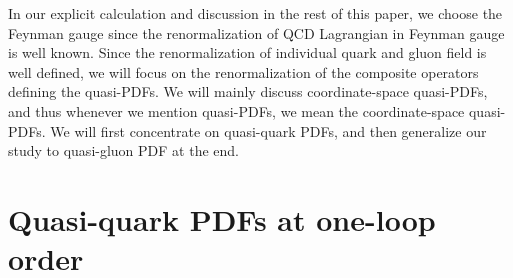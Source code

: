 \documentclass[twocolumn,aps,prd,superscriptaddress,nofootinbib,showpacs]{revtex4}
\begin{document}
In our explicit calculation and discussion in the rest of this paper, we choose the Feynman gauge since the renormalization of QCD Lagrangian in Feynman gauge is well known.  Since the renormalization of individual quark and gluon field is well defined, we will focus on the renormalization of the composite operators defining the quasi-PDFs.  We will mainly discuss coordinate-space quasi-PDFs, and thus whenever we mention quasi-PDFs,  we mean the coordinate-space quasi-PDFs.  We will first concentrate on quasi-quark PDFs, and then generalize our study to quasi-gluon PDF at the end.


\section{Quasi-quark PDFs at one-loop order}
\label{sec:oneloop}
\end{document}
